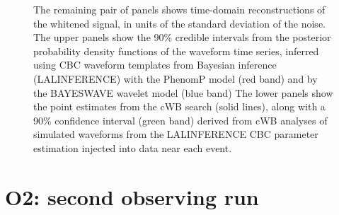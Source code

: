 \documentclass[binding=0.6cm, LaM]{sapthesis}
\begin{document}
\begin{figure}[H]
{                                      The remaining pair of panels shows time-domain reconstructions of the whitened signal,
                                      in units of the standard deviation of the noise.
                                      The upper panels show the 90\% credible intervals from the posterior 
                                      probability density functions of the waveform time series,
                                      inferred using CBC waveform templates from Bayesian inference (LALINFERENCE)
                                      with the PhenomP model (red band) and by the BAYESWAVE wavelet model (blue band) 
                                      The lower panels show the point estimates from the cWB search (solid lines),
                                      along with a 90\% confidence interval (green band) derived from cWB analyses of
                                      simulated waveforms from the LALINFERENCE CBC parameter estimation injected into data near each event. \cite{193}}
                         \label{fig:o1}
                \end{figure}


\section{O2: second observing run}
\end{document}
